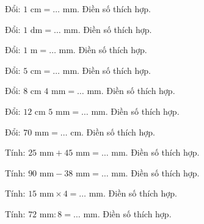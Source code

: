 \begin{ex}
Đổi: $1\text{ cm} = \dots\text{ mm}$. Điền số thích hợp.
\end{ex}

\begin{ex}
Đổi: $1\text{ dm} = \dots\text{ mm}$. Điền số thích hợp.
\end{ex}

\begin{ex}
Đổi: $1\text{ m} = \dots\text{ mm}$. Điền số thích hợp.
\end{ex}

\begin{ex}
Đổi: $5\text{ cm} = \dots\text{ mm}$. Điền số thích hợp.
\end{ex}

\begin{ex}
Đổi: $8\text{ cm } 4\text{ mm} = \dots\text{ mm}$. Điền số thích hợp.
\end{ex}

\begin{ex}
Đổi: $12\text{ cm } 5\text{ mm} = \dots\text{ mm}$. Điền số thích hợp.
\end{ex}

\begin{ex}
Đổi: $70\text{ mm} = \dots\text{ cm}$. Điền số thích hợp.
\end{ex}

\begin{ex}
Tính: $25\text{ mm} + 45\text{ mm} = \dots\text{ mm}$. Điền số thích hợp.
\end{ex}

\begin{ex}
Tính: $90\text{ mm} - 38\text{ mm} = \dots\text{ mm}$. Điền số thích hợp.
\end{ex}

\begin{ex}
Tính: $15\text{ mm} \times 4 = \dots\text{ mm}$. Điền số thích hợp.
\end{ex}

\begin{ex}
Tính: $72\text{ mm} : 8 = \dots\text{ mm}$. Điền số thích hợp.
\end{ex}

